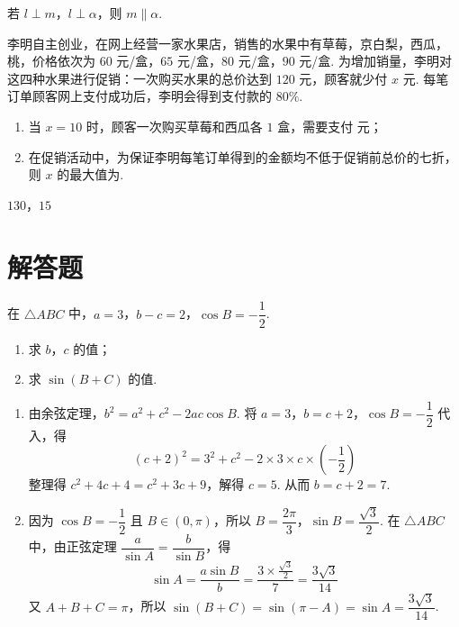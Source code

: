 \begin{answer}
若 \(l\perp m\)，\(l\perp\alpha\)，则 \(m\parallel\alpha\).
\end{answer}

\begin{problem}
李明自主创业，在网上经营一家水果店，销售的水果中有草莓，京白梨，西瓜，桃，价格依次为 \(60\) 元/盒，\(65\) 元/盒，\(80\) 元/盒，\(90\) 元/盒. 为增加销量，李明对这四种水果进行促销：一次购买水果的总价达到 \(120\) 元，顾客就少付 \(x\) 元. 每笔订单顾客网上支付成功后，李明会得到支付款的 \(80\%\).

\begin{enumerate}
\item 当 \(x=10\) 时，顾客一次购买草莓和西瓜各 \(1\) 盒，需要支付\fillinblank{} 元；

\item 在促销活动中，为保证李明每笔订单得到的金额均不低于促销前总价的七折，则 \(x\) 的最大值为\fillinblank{}.
\end{enumerate}
\end{problem}

\begin{answer}
\(130\)，\(15\)
\end{answer}

\section{解答题}

\begin{problem}
在 \(\triangle ABC\) 中，\(a=3\)，\(b-c=2\)，\(\cos B=-\dfrac12\).

\begin{enumerate}
\item 求 \(b\)，\(c\) 的值；

\item 求 \(\sin(B+C)\) 的值.
\end{enumerate}
\end{problem}

\begin{solution}
\begin{enumerate}
\item 由余弦定理，\(b^2=a^2+c^2-2ac\cos B\). 将 \(a=3\)，\(b=c+2\)，\(\cos B=-\dfrac12\) 代入，得
\[
(c+2)^2=3^2+c^2-2\times3\times c\times\left(-\frac12\right)
\]
整理得 \(c^2+4c+4=c^2+3c+9\)，解得 \(c=5\). 从而 \(b=c+2=7\).

\item 因为 \(\cos B=-\dfrac12\) 且 \(B\in(0,\pi)\)，所以 \(B=\dfrac{2\pi}{3}\)，\(\sin B=\dfrac{\sqrt3}{2}\).
在 \(\triangle ABC\) 中，由正弦定理 \(\dfrac{a}{\sin A}=\dfrac{b}{\sin B}\)，得
\[
\sin A=\frac{a\sin B}{b}=\frac{3\times\frac{\sqrt3}{2}}{7}=\frac{3\sqrt3}{14}
\]
又 \(A+B+C=\pi\)，所以 \(\sin(B+C)=\sin(\pi-A)=\sin A=\dfrac{3\sqrt3}{14}\).
\end{enumerate}
\end{solution}

